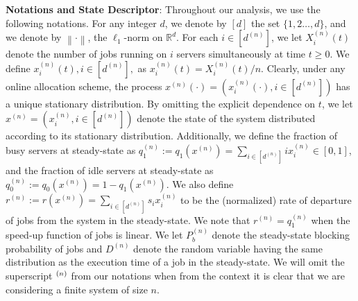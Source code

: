 \documentclass[a4paper]{article}
\theoremstyle{plain}
\newtheorem{remark}{Remark}
\theoremstyle{definition}
\theoremstyle{case}
\theoremstyle{remark}
\newcommand{\norm}[1]{\left\lVert#1\right\rVert}
\begin{document}

{\bf Notations and State Descriptor}: Throughout our analysis, we use the following notations. For any integer $d$, we denote by $[d]$ the set $\{1,2\ldots,d\}$, and we denote by $\norm{\cdot}$, the $\ell_1$-norm on $\mathbb R^d$. For each $i \in [d^{(n)}]$, we let $X_i^{(n)}(t)$ denote the number of jobs running on $i$ servers simultaneously at time $t\geq 0$. We define $x_i^{(n)}(t), i\in [d^{(n)}],$ as $x_i^{(n)}(t)=X_i^{(n)}(t)/n$. Clearly, under any online allocation scheme, the process $x^{(n)}(\cdot)=(x_i^{(n)}(\cdot), i\in [d^{(n)}])$ has a unique stationary distribution. By omitting the explicit dependence on $t$, we let $x^{(n)}=(x_i^{(n)}, i\in [d^{(n)}])$ denote the state of the system distributed according to its stationary distribution. Additionally, we define the fraction of busy servers at steady-state as $q_1^{(n)} := q_1(x^{(n)}) = \sum_{i \in [d^{(n)}]} ix_i^{(n)} \in [0,1]$, and the fraction of idle servers at steady-state as $q_0^{(n)}:=q_0(x^{(n)}) = 1 - q_1(x^{(n)})$. We also define  $r^{(n)}:=r(x^{(n)})=\sum_{i \in [d^{(n)}]} s_i x_i^{(n)}$ to be the (normalized) rate of departure of jobs from the system in the steady-state. We note that $r^{(n)}=q_1^{(n)}$ when the speed-up function of jobs is linear. We let $P_b^{(n)}$ denote the steady-state blocking probability of jobs and $D^{(n)}$ denote the random variable having the same distribution as the execution time of a job in the steady-state. We will omit the superscript $\vphantom{\cdot}^{(n)}$ from our notations when from the context it is clear that we are considering a finite system of size $n$.
\end{document}
